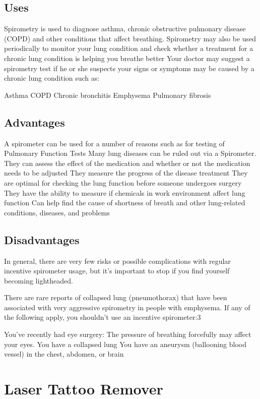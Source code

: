 \documentclass[12pt]{article}
\begin{document}
\subsection{Uses}
Spirometry is used to diagnose asthma, chronic obstructive pulmonary disease (COPD) and other conditions that affect breathing. Spirometry may also be used periodically to monitor your lung condition and check whether a treatment for a chronic lung condition is helping you breathe better
Your doctor may suggest a spirometry test if he or she suspects your signs or symptoms may be caused by a chronic lung condition such as:

Asthma
COPD
Chronic bronchitis
Emphysema
Pulmonary fibrosis

\subsection{Advantages}

A spirometer can be used for a number of reasons such as for testing of Pulmonary Function Tests
Many lung diseases can be ruled out via a Spirometer.
They can assess the effect of the medication and whether or not the medication needs to be adjusted
They measure the progress of the disease treatment
They are optimal for checking the lung function before someone undergoes surgery
They have the ability to measure if chemicals in work environment affect lung function
Can help find the cause of shortness of breath and other lung-related conditions, diseases, and problems


\subsection{Disadvantages}

In general, there are very few risks or possible complications with regular incentive spirometer usage, but it's important to stop if you find yourself becoming lightheaded.

There are rare reports of collapsed lung (pneumothorax) that have been associated with very aggressive spirometry in people with emphysema. If any of the following apply, you shouldn't use an incentive spirometer:3﻿

You've recently had eye surgery: The pressure of breathing forcefully may affect your eyes.
You have a collapsed lung
You have an aneurysm (ballooning blood vessel) in the chest, abdomen, or brain
\clearpage
\section{Laser Tattoo Remover}
\end{document}
